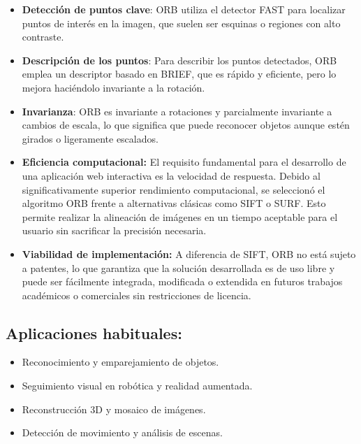 \begin{itemize}
    \item \textbf{Detección de puntos clave}: ORB utiliza el detector FAST para localizar puntos de interés en la imagen, que suelen ser esquinas o regiones con alto contraste.
    \item \textbf{Descripción de los puntos}: Para describir los puntos detectados, ORB emplea un descriptor basado en BRIEF, que es rápido y eficiente, pero lo mejora haciéndolo invariante a la rotación.
    \item \textbf{Invarianza}: ORB es invariante a rotaciones y parcialmente invariante a cambios de escala, lo que significa que puede reconocer objetos aunque estén girados o ligeramente escalados.

    \item \textbf{Eficiencia computacional:} El requisito fundamental para el desarrollo de una aplicación web interactiva es la velocidad de respuesta. Debido al significativamente superior rendimiento computacional, se seleccionó el algoritmo ORB frente a alternativas clásicas como SIFT o SURF. Esto permite realizar la alineación de imágenes en un tiempo aceptable para el usuario sin sacrificar la precisión necesaria.

    \item \textbf{Viabilidad de implementación:} A diferencia de SIFT, ORB no está sujeto a patentes, lo que garantiza que la solución desarrollada es de uso libre y puede ser fácilmente integrada, modificada o extendida en futuros trabajos académicos o comerciales sin restricciones de licencia. 
\end{itemize}


\subsection{Aplicaciones habituales:}

\begin{itemize}
    \item Reconocimiento y emparejamiento de objetos.
    \item Seguimiento visual en robótica y realidad aumentada.
    \item Reconstrucción 3D y mosaico de imágenes.
    \item Detección de movimiento y análisis de escenas.
\end{itemize}


